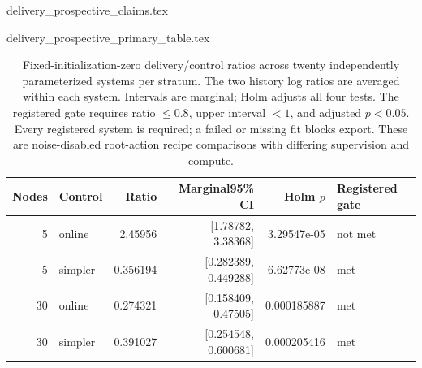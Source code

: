 \begin{filecontents*}[overwrite]{delivery_prospective_claims.tex}
\newcommand{\BSystemsPerStratum}{20}
\newcommand{\BScoredFits}{640}
\newcommand{\BFiveOnlineRatio}{2.45956}
\newcommand{\BFiveOnlineCILow}{1.78782}
\newcommand{\BFiveOnlineCIHigh}{3.38368}
\newcommand{\BFiveOnlineHolmP}{3.29547e-05}
\newcommand{\BFiveOnlineGate}{not met}
\newcommand{\BFiveFlatRatio}{0.356194}
\newcommand{\BFiveFlatCILow}{0.282389}
\newcommand{\BFiveFlatCIHigh}{0.449288}
\newcommand{\BFiveFlatHolmP}{6.62773e-08}
\newcommand{\BFiveFlatGate}{met}
\newcommand{\BThirtyOnlineRatio}{0.274321}
\newcommand{\BThirtyOnlineCILow}{0.158409}
\newcommand{\BThirtyOnlineCIHigh}{0.47505}
\newcommand{\BThirtyOnlineHolmP}{0.000185887}
\newcommand{\BThirtyOnlineGate}{met}
\newcommand{\BThirtyFlatRatio}{0.391027}
\newcommand{\BThirtyFlatCILow}{0.254548}
\newcommand{\BThirtyFlatCIHigh}{0.600681}
\newcommand{\BThirtyFlatHolmP}{0.000205416}
\newcommand{\BThirtyFlatGate}{met}
\end{filecontents*}
\begin{filecontents*}[overwrite]{delivery_prospective_primary_table.tex}
\begin{table}[ht]
\centering\small
\begin{tabular}{rlrrrl}
\toprule
Nodes & Control & Ratio & Marginal95\% CI & Holm $p$ & Registered gate\\
\midrule
5 & online & 2.45956 & [1.78782, 3.38368] & 3.29547e-05 & not met\\
5 & simpler & 0.356194 & [0.282389, 0.449288] & 6.62773e-08 & met\\
30 & online & 0.274321 & [0.158409, 0.47505] & 0.000185887 & met\\
30 & simpler & 0.391027 & [0.254548, 0.600681] & 0.000205416 & met\\
\bottomrule
\end{tabular}
\caption{Fixed-initialization-zero delivery/control ratios across twenty independently parameterized systems per stratum. The two history log ratios are averaged within each system. Intervals are marginal; Holm adjusts all four tests. The registered gate requires ratio $\leq0.8$, upper interval $<1$, and adjusted $p<0.05$. Every registered system is required; a failed or missing fit blocks export. These are noise-disabled root-action recipe comparisons with differing supervision and compute.}
\label{tab:prospective-primary}
\end{table}
\end{filecontents*}
